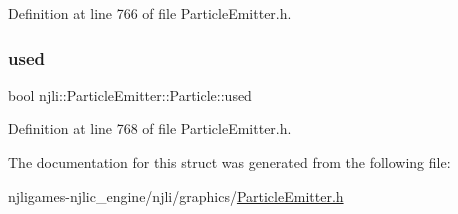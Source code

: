 Definition at line 766 of file Particle\+Emitter.\+h.

\mbox{\label{structnjli_1_1_particle_emitter_1_1_particle_a223d0b5f5ad07c8dede4f7f354ddd9c2}} 
\subsubsection{\texorpdfstring{used}{used}}
{\footnotesize\ttfamily bool njli\+::\+Particle\+Emitter\+::\+Particle\+::used}



Definition at line 768 of file Particle\+Emitter.\+h.



The documentation for this struct was generated from the following file\+:\begin{DoxyCompactItemize}
\item 
njligames-\/njlic\+\_\+engine/njli/graphics/\mbox{\hyperlink{_particle_emitter_8h}{Particle\+Emitter.\+h}}\end{DoxyCompactItemize}
